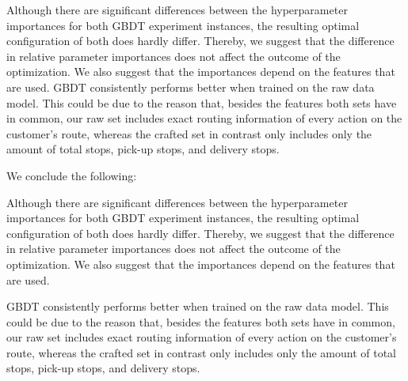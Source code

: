 Although there are significant differences between the hyperparameter importances for both GBDT experiment instances, the resulting optimal configuration of both does hardly differ. Thereby, we suggest that the difference in relative parameter importances does not affect the outcome of the optimization. We also suggest that the importances depend on the features that are used.
GBDT consistently performs better when trained on the raw data model. This could be due to the reason that, besides the features both sets have in common, our raw set includes exact routing information of every action on the customer's route, whereas the crafted set in contrast only includes only the amount of total stops, pick-up stops, and delivery stops.

We conclude the following: 
\begin{description}[font=$\bullet$\scshape\bfseries]
	\item Although there are significant differences between the hyperparameter importances for both GBDT experiment instances, the resulting optimal configuration of both does hardly differ. Thereby, we suggest that the difference in relative parameter importances does not affect the outcome of the optimization. We also suggest that the importances depend on the features that are used.
	\item GBDT consistently performs better when trained on the raw data model. This could be due to the reason that, besides the features both sets have in common, our raw set includes exact routing information of every action on the customer's route, whereas the crafted set in contrast only includes only the amount of total stops, pick-up stops, and delivery stops.
\end{description}
\clearpage
